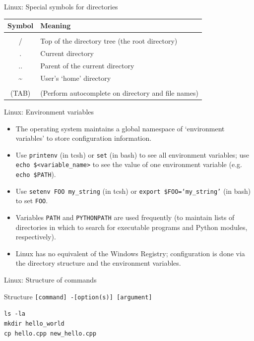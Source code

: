 \documentclass{beamer}
\begin{document}
\begin{frame}{Linux: Special symbols for directories}
  \begin{table}[ht]
    \centering
    \begin{tabular}{c l}
      \\ [-2ex]
      Symbol & Meaning \\ [.5ex]
      \hline \\ [-2ex]
      / & Top of the directory tree (the root directory) \\
      . & Current directory \\
      .. & Parent of the current directory \\
      \textasciitilde & User's `home' directory \\ \\
      (TAB) & (Perform autocomplete on directory and file names) \\
    \end{tabular}
  \end{table}
\end{frame}


\begin{frame}{Linux: Environment variables}
  \begin{itemize}
    \item The operating system maintains a global namespace of `environment variables' to store configuration information.
    \item Use \alert{\texttt{printenv}} (in tcsh) or \alert{\texttt{set}} (in bash) to see all environment variables; use \alert{\texttt{echo \$<variable\_name>}} to see the value of one environment variable (e.g. \alert{\texttt{echo \$PATH}}).
    \item Use \alert{\texttt{setenv FOO my\_string}} (in tcsh) or \alert{\texttt{export \$FOO=`my\_string'}} (in bash) to set \texttt{FOO}.
    \item Variables \texttt{PATH} and \texttt{PYTHONPATH} are used frequently (to maintain lists of directories in which to search for executable programs and Python modules, respectively).
    \item Linux has no equivalent of the Windows Registry; configuration is done via the directory structure and the environment variables.
  \end{itemize}
\end{frame}



\begin{frame}{Linux: Structure of commands}
  \begin{block}{Structure}
    \texttt{[command] -[option(s)] [argument]}
  \end{block}
  \begin{Examples}
     \texttt{ls -la \\
     mkdir hello\_world \\
     cp hello.cpp new\_hello.cpp} \\
  \end{Examples}
\end{frame}
\end{document}
